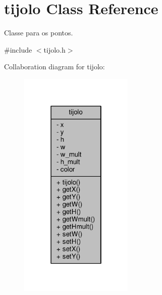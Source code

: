 \hypertarget{classtijolo}{}\section{tijolo Class Reference}
\label{classtijolo}


Classe para os pontos.  




{\ttfamily \#include $<$tijolo.\+h$>$}



Collaboration diagram for tijolo\+:
\nopagebreak
\begin{figure}[H]
\begin{center}
\leavevmode
\includegraphics[width=154pt]{classtijolo__coll__graph}
\end{center}
\end{figure}
